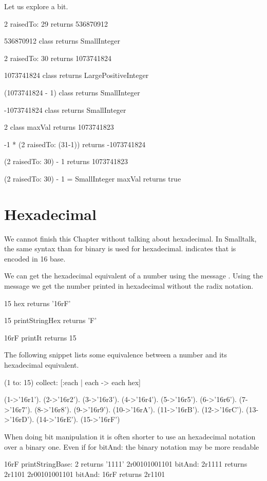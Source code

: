 \documentclass[a4paper,10pt,twoside]{book}
\begin{document}
Let us explore a bit. 

\begin{code}{}
2 raisedTo: 29 
	returns 536870912 

536870912 class
	returns SmallInteger

2 raisedTo: 30 
	returns 1073741824

1073741824 class
	returns LargePositiveInteger
	
(1073741824 - 1) class
	returns SmallInteger

-1073741824 class 
	returns SmallInteger

2 class maxVal 
	returns 1073741823

-1 * (2 raisedTo: (31-1)) 
	returns -1073741824
	
(2 raisedTo: 30) - 1
	returns 1073741823
	
(2 raisedTo: 30) - 1 = SmallInteger maxVal	
	returns true
\end{code}

\section{Hexadecimal}
We cannot finish this Chapter without talking about hexadecimal. In Smalltalk, the same syntax than for binary is used for hexadecimal.  indicates that  is encoded in 16 base. 

We can get the hexadecimal equivalent of a number using the message . 
Using the message  we get the number printed in hexadecimal without the radix notation. 

\begin{code}{}
15 hex
	returns '16rF'
	
15 printStringHex 
	returns 'F'

16rF printIt
	returns 15
\end{code}

The following snippet lists some equivalence between a number and its hexadecimal equivalent.
\begin{code}
(1 to: 15) collect: [:each | each -> each hex] 

{(1->'16r1'). (2->'16r2'). (3->'16r3'). (4->'16r4'). (5->'16r5'). (6->'16r6'). (7->'16r7'). (8->'16r8'). (9->'16r9'). (10->'16rA'). (11->'16rB'). (12->'16rC'). (13->'16rD'). (14->'16rE'). (15->'16rF')}
\end{code}

When doing bit manipulation it is often shorter to use an hexadecimal notation over a binary one. Even if for bitAnd: the binary notation may be more readable
\begin{code}{}
16rF printStringBase: 2
	returns '1111'
2r00101001101 bitAnd: 2r1111	
	returns 2r1101
2r00101001101 bitAnd: 16rF
	returns 2r1101
\end{code}
\end{document}
